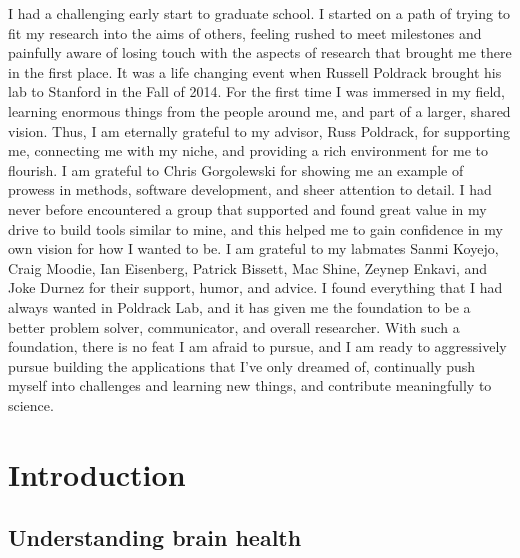 \documentclass{report}
\begin{document}
I had a challenging early start to graduate school. I started on a path
of trying to fit my research into the aims of others, feeling rushed to
meet milestones and painfully aware of losing touch with the aspects of
research that brought me there in the first place. It was a life
changing event when Russell Poldrack brought his lab to Stanford in the
Fall of 2014. For the first time I was immersed in my field, learning
enormous things from the people around me, and part of a larger, shared
vision. Thus, I am eternally grateful to my advisor, Russ Poldrack, for
supporting me, connecting me with my niche, and providing a rich
environment for me to flourish. I am grateful to Chris Gorgolewski for
showing me an example of prowess in methods, software development, and
sheer attention to detail. I had never before encountered a group that
supported and found great value in my drive to build tools similar to
mine, and this helped me to gain confidence in my own vision for how I
wanted to be. I am grateful to my labmates Sanmi Koyejo, Craig Moodie,
Ian Eisenberg, Patrick Bissett, Mac Shine, Zeynep Enkavi, and Joke
Durnez for their support, humor, and advice. I found everything that I
had always wanted in Poldrack Lab, and it has given me the foundation to
be a better problem solver, communicator, and overall researcher. With
such a foundation, there is no feat I am afraid to pursue, and I am
ready to aggressively pursue building the applications that I've only
dreamed of, continually push myself into challenges and learning new
things, and contribute meaningfully to science.

\afterpreface

\chapter{Introduction}

\section{Understanding brain health}
\end{document}
